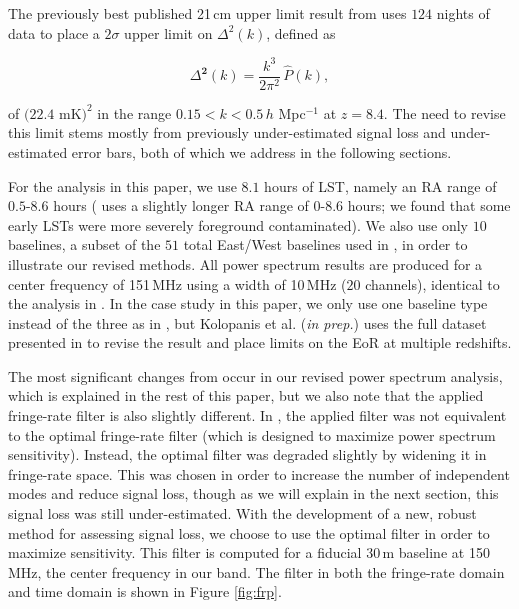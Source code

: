 \documentclass[preprint2,numberedappendix,tighten]{aastex6}  %
\begin{document}
The previously best published 21\,cm upper limit result from  uses $124$ nights of data to place a $2\sigma$ upper limit 
on $\Delta^{2}(k)$, defined as

\begin{equation}
\Delta^{\textbf{2}}(k) = \frac{k^{3}}{2\pi^{2}}\,\hat{P}(k),
\end{equation}

\noindent of $(22.4$ mK$)^{2}$ in the range $0.15 < k < 0.5$\,$h$ Mpc$^{-1}$ at $z = 8.4$. The need to revise this limit stems mostly from previously under-estimated signal loss and under-estimated error bars, both of which we 
address in the following sections. 

For the analysis in this paper, we use $8.1$ hours of LST, namely an RA range of $0.5$-$8.6$ hours ( uses a slightly longer RA 
range of $0$-$8.6$ hours; we found that some early LSTs were more severely foreground contaminated). We also use only $10$ baselines, a subset of the $51$ total East/West baselines used in , in order to illustrate our revised methods. All power spectrum results are produced for a center frequency of 151\,MHz using a width of 10\,MHz ($20$ channels), identical to the analysis in . In the case study in this paper, we only use one baseline type instead of the three as in 
, but Kolopanis et al. (\textit{in prep.}) uses the full dataset presented in  to revise the result and place limits on the EoR at multiple redshifts.

The most significant changes from  occur in our revised power spectrum analysis, which is explained in the rest of this paper, but we also note that the applied fringe-rate filter is also slightly different. In , the 
applied filter was not equivalent to the optimal fringe-rate filter (which is designed to maximize power spectrum sensitivity). Instead, the optimal filter was degraded slightly by widening it in fringe-rate space. This was chosen in order to increase the number of independent 
modes and reduce signal loss, though as we will explain in the next section, this signal loss was still under-estimated. With the development of a new, 
robust method for assessing signal loss, we choose to use the optimal filter in order to maximize sensitivity. This filter is 
computed for a fiducial 30\,m baseline at 150\,MHz, the center frequency in our band. The filter in both the fringe-rate 
domain and time domain is shown in Figure \ref{fig:frp}.
\end{document}

